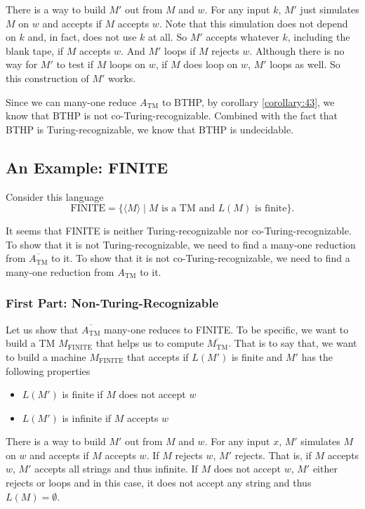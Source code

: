 \documentclass[11pt]{article}
\begin{document}
There is a way to build $M'$ out from $M$ and $w$. For any input $k$, $M'$ just simulates $M$ on $w$
and accepts if $M$ accepts $w$. Note that this simulation does not depend on $k$ and, in fact, does
not use $k$ at all. So $M'$ accepts whatever $k$, including the blank tape, if $M$ accepts $w$. And
$M'$ loops if $M$ rejects $w$. Although there is no way for $M'$ to test if $M$ loops on $w$, if
$M$ does loop on $w$, $M'$ loops as well. So this construction of $M'$ works.

Since we can many-one reduce $A_{\mathrm{TM}}$ to BTHP, by corollary \ref{corollary:43}, we know that
BTHP is not co-Turing-recognizable. Combined with the fact that BTHP is Turing-recognizable,
we know that BTHP is undecidable.

\subsection{An Example: FINITE}

Consider this language
\[
  \mathrm{FINITE} = \{\langle M \rangle \mid M \text{ is a TM and } L(M) \text{ is finite}\}.
\]

It seems that FINITE is neither Turing-recognizable nor co-Turing-recognizable. To show that it is
not Turing-recognizable, we need to find a many-one reduction from $\overline{A_{\mathrm{TM}}}$ to it. To show
that it is not co-Turing-recognizable, we need to find a many-one reduction from $A_{\mathrm{TM}}$ to it.

\subsubsection{First Part: Non-Turing-Recognizable}

Let us show that $\overline{A_{\mathrm{TM}}}$ many-one reduces to FINITE. To be specific, we want to build a TM
$M_{\mathrm{FINITE}}$ that helps us to compute $\overline{M_{\mathrm{TM}}}$. That is to say that, we want to build a
machine $M_{\mathrm{FINITE}}$ that accepts if $L(M')$ is finite and $M'$ has the following properties
\begin{itemize}
\item $L(M')$ is finite if $M$ does not accept $w$
\item $L(M')$ is infinite if $M$ accepts $w$
\end{itemize}

There is a way to build $M'$ out from $M$ and $w$. For any input $x$, $M'$ simulates $M$ on $w$ and
accepts if $M$ accepts $w$. If $M$ rejects $w$, $M'$ rejects. That is, if $M$ accepts $w$, $M'$
accepts all strings and thus infinite. If $M$ does not accept $w$, $M'$ either rejects or loops and
in this case, it does not accept any string and thus $L(M) = \emptyset$.
\end{document}
